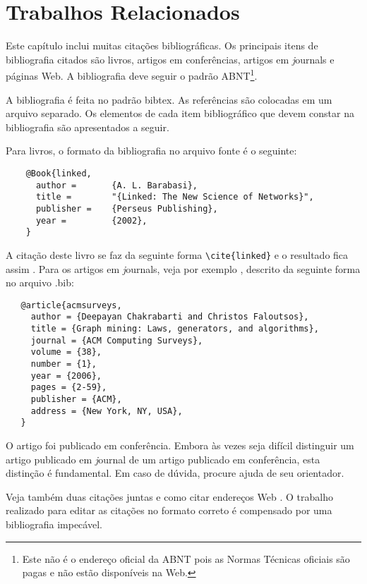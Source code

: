 %
%

\chapter{Trabalhos Relacionados}

Este capítulo inclui muitas citações bibliográficas. Os principais
itens de bibliografia citados são livros, artigos em conferências,
artigos em {\textit journals} e páginas Web. A bibliografia deve seguir o
padrão ABNT\footnote{Este não é o endereço oficial da
ABNT pois as Normas Técnicas oficiais são pagas e não estão disponíveis na Web.}.

A bibliografia é feita no padrão {\ttfamily bibtex}.  As referências são
colocadas em um arquivo separado. Os elementos de
cada item bibliográfico que devem constar na bibliografia são
apresentados a seguir.

Para livros, o formato da bibliografia no arquivo fonte é o seguinte:

\begin{verbatim}
    @Book{linked,
      author =       {A. L. Barabasi},
      title =        "{Linked: The New Science of Networks}",
      publisher =    {Perseus Publishing},
      year =         {2002},
    }
\end{verbatim}

A citação deste livro se faz da seguinte forma \verb#\cite{linked}# e o resultado fica assim \cite{linked}.
Para os artigos em {\textit journals}, veja por exemplo \cite{acmsurveys},
descrito da seguinte forma no arquivo {\ttfamily .bib}:

\begin{verbatim}
   @article{acmsurveys,
     author = {Deepayan Chakrabarti and Christos Faloutsos},
     title = {Graph mining: Laws, generators, and algorithms},
     journal = {ACM Computing Surveys},
     volume = {38},
     number = {1},
     year = {2006},
     pages = {2-59},
     publisher = {ACM},
     address = {New York, NY, USA},
   }
\end{verbatim}

O artigo \cite{3faloutsos} foi publicado em conferência.  Embora
às vezes seja difícil distinguir um artigo publicado em {\textit
  journal} de um artigo publicado em conferência, esta distinção é
fundamental.  Em caso de dúvida, procure ajuda de seu orientador.

Veja também duas citações juntas \cite{rp99,mar00}  e como citar
endereços Web \cite{irl:06}.
O trabalho realizado para editar as citações no formato correto é
compensado por uma bibliografia impecável.

